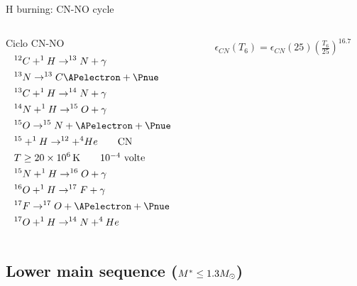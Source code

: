 \begin{frame}{H burning: CN-NO cycle}
\begin{columns}[T]\begin{column}{0.5\textwidth}
Ciclo CN-NO
\begin{align*}
&^{12}C+^1H\to^{13}N+\gamma\\
&^{13}N\to^{13}C\APelectron+\Pnue\\
&^{13}C+^1H\to^{14}N+\gamma\\
&^{14}N+^1H\to^{15}O+\gamma\\
&^{15}O\to^{15}N+\APelectron+\Pnue\\
&^{15}+^1H\to^{12}+^4He\tag*{CN}\\
&T\geq\SI{20e6}{\kelvin}\tag*{\num{e-4} volte}\\
&^{15}N+^1H\to^{16}O+\gamma\\
&^{16}O+^1H\to^{17}F+\gamma\\
&^{17}F\to^{17}O+\APelectron+\Pnue\\
&^{17}O+^1H\to^{14}N+^4He
\end{align*}
\end{column}\begin{column}{0.5\textwidth}
\begin{align*}
&\epsilon_{CN}(T_6)=\epsilon_{CN}(25)(\frac{T_6}{25})^{16.7}
\end{align*}
\end{column}\end{columns}
\end{frame}

\subsection{Lower main sequence ($M^*\leq1.3M_{\odot}{}$)}


